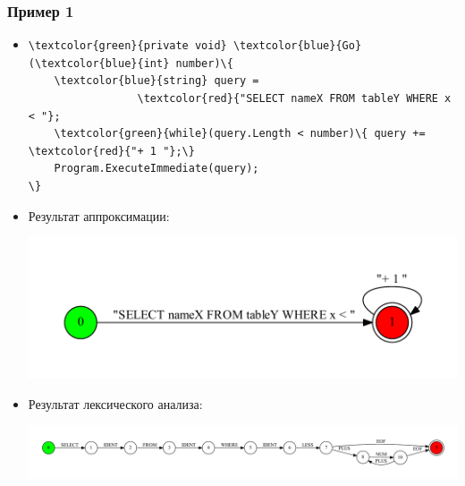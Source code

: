 \documentclass{beamer}
\begin{document}
\begin{frame}[fragile]
\transwipe[direction=90]
\frametitle{Пример 1}
\begin{itemize}
\item \begin{Verbatim}[commandchars=\\\{\}]
\textcolor{green}{private void} \textcolor{blue}{Go} (\textcolor{blue}{int} number)\{
    \textcolor{blue}{string} query =
                 \textcolor{red}{"SELECT nameX FROM tableY WHERE x < "};
    \textcolor{green}{while}(query.Length < number)\{ query += \textcolor{red}{"+ 1 "};\} 
    Program.ExecuteImmediate(query);
\}
\end{Verbatim}

\item Результат аппроксимации: 
\begin{center}
   \includegraphics[width=.6\linewidth]{while_appr}
\end{center}
\item Результат лексического анализа: \\
\begin{center}
   \includegraphics[width=1.0\linewidth]{WhileEx}
\end{center}
\end{itemize}
\end{frame}
\end{document}
